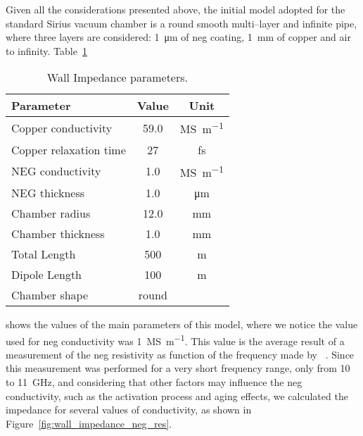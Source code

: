     Given all the considerations presented above, the initial model adopted for the standard Sirius vacuum chamber is a round smooth multi--layer and infinite pipe, where three layers are considered: \SI{1}{\micro\meter} of \gls{neg} coating, \SI{1}{\milli\meter} of copper and air to infinity. Table~\ref{tab:wall_impedance_parameters}
    \begin{table}
        \centering
        \caption{Wall Impedance parameters.}
        \label{tab:wall_impedance_parameters}
        \begin{tabular}{lcc}
            \toprule
            Parameter              &   Value    & Unit \\
            \midrule
            Copper conductivity    &   59.0     & \si{\mega\siemens\per\meter}\\
            Copper relaxation time &   27       & \si{\femto\second}\\
            NEG conductivity       &   1.0      & \si{\mega\siemens\per\meter}\\
            NEG thickness          &   1.0      & \si{\micro\meter}\\
            Chamber radius         &  12.0      & \si{\milli\meter}\\
            Chamber thickness      &   1.0      & \si{\milli\meter}\\
            Total Length           &  500       & \si{\meter}\\
            Dipole Length          &  100       & \si{\meter}\\
            Chamber shape          & round      & \\
            \bottomrule
        \end{tabular}
    \end{table}
    shows the values of the main parameters of this model, where we notice the value used for \gls{neg} conductivity was \SI{1}{\mega\siemens\per\meter}. This value is the average result of a measurement of the \gls{neg} resistivity as function of the frequency made by ~. Since this measurement was performed for a very short frequency range, only from \SI{10}{} to \SI{11}{\giga\hertz}, and considering that other factors may influence the \gls{neg} conductivity, such as the activation process and aging effects, we calculated the impedance for several values of conductivity, as shown in Figure~\ref{fig:wall_impedance_neg_res}.

